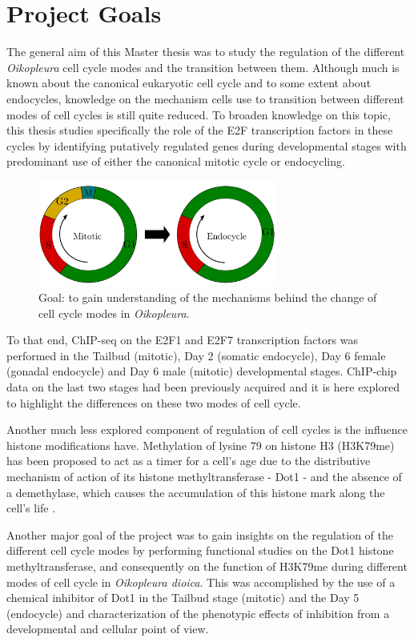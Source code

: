 \documentclass[11pt,twoside,a4paper]{report}
\begin{document}
	\clearpage
	\section{Project Goals}
		The general aim of this Master thesis was to study the regulation of the different \textit{Oikopleura} cell cycle modes and the transition between them. Although much is known about the canonical eukaryotic cell cycle and to some extent about endocycles, knowledge on the mechanism cells use to transition between different modes of cell cycles is still quite reduced.	 To broaden knowledge on this topic, this thesis studies specifically the role of the E2F transcription factors in these cycles by identifying putatively regulated genes during developmental stages with predominant use of either the canonical mitotic cycle or endocycling.
		
		\begin{figure}[here]
			\centering
			\includegraphics[width=0.7\textwidth]{pngs/change_cell-cycle.png}
			\caption{Goal: to gain understanding of the mechanisms behind the change of cell cycle modes in \textit{Oikopleura}.}
			\label{fig:goal_cycles}
		\end{figure}
		
		To that end, ChIP-seq on the E2F1 and E2F7 transcription factors was performed in the Tailbud (mitotic), Day 2 (somatic endocycle), Day 6 female (gonadal endocycle) and Day 6 male (mitotic) developmental stages. ChIP-chip data on the last two stages had been previously acquired and it is here explored to highlight the differences on these two modes of cell cycle.
		
		Another much less explored component of regulation of cell cycles is the influence histone modifications have. Methylation of lysine 79 on histone H3 (H3K79me) has been proposed to act as a timer for a cell's age due to the distributive mechanism of action of its histone methyltransferase - Dot1 - and the absence of a demethylase, which causes the accumulation of this histone mark along the cell's life	.
		
		Another major goal of the project was to gain insights on the regulation of the different cell cycle modes by performing functional studies on the Dot1 histone methyltransferase, and consequently on the function of H3K79me during different modes of cell cycle in \textit{Oikopleura dioica}. This was accomplished by the use of a chemical inhibitor of Dot1 in the Tailbud stage (mitotic) and the Day 5 (endocycle) and characterization of the phenotypic effects of inhibition from a developmental and cellular point of view.
		
\end{document}
